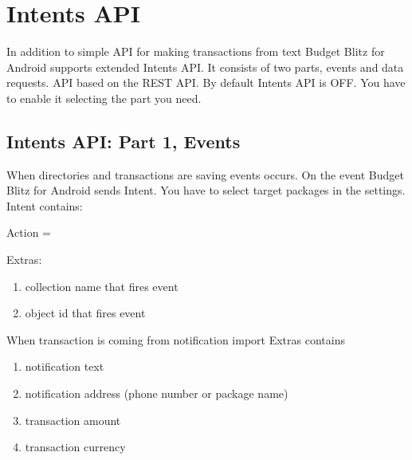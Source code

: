 \documentclass[a4paper,10pt,english]{sphinxmanual}
\begin{document}
\section{Intents API}
\label{\detokenize{api:intents-api}}
\sphinxAtStartPar
In addition to simple API for making transactions from text Budget Blitz for Android supports extended Intents API. It consists of two parts,
events and data requests. API based on the REST API. By default Intents API is OFF. You have to enable it
selecting the part you need.


\subsection{Intents API: Part 1, Events}
\label{\detokenize{api:intents-api-part-1-events}}
\sphinxAtStartPar
When directories and transactions are saving events occurs. On the event Budget Blitz for Android sends Intent. You have to select target
packages in the settings. Intent contains:

\sphinxAtStartPar
Action = 

\sphinxAtStartPar
Extras:
\begin{enumerate}
%
\item {} 
\sphinxAtStartPar
{} \sphinxhyphen{} collection name that fires event

\item {} 
\sphinxAtStartPar
{} \sphinxhyphen{} object id that fires event

\end{enumerate}

\sphinxAtStartPar
When transaction is coming from notification import Extras contains
\begin{enumerate}
%
\item {} 
\sphinxAtStartPar
{} \sphinxhyphen{} notification text

\item {} 
\sphinxAtStartPar
{} \sphinxhyphen{} notification address (phone number or package name)

\item {} 
\sphinxAtStartPar
{} \sphinxhyphen{} transaction amount

\item {} 
\sphinxAtStartPar
{} \sphinxhyphen{} transaction currency

\end{enumerate}
\end{document}
